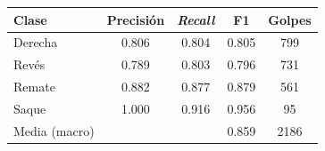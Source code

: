 \begin{tabular}{lcccc}
\toprule
\textbf{Clase} & \textbf{Precisión} & \textbf{\textit{Recall}} & \textbf{F1} & \textbf{Golpes} \\
\midrule
Derecha & \num{0.806} & \num{0.804} & \num{0.805} & \num{799} \\
Revés & \num{0.789} & \num{0.803} & \num{0.796} & \num{731} \\
Remate & \num{0.882} & \num{0.877} & \num{0.879} & \num{561} \\
Saque & \num{1.000} & \num{0.916} & \num{0.956} & \num{95} \\
\midrule
Media (macro) &  &  & \num{0.859} & \num{2186} \\
\bottomrule
\end{tabular}

